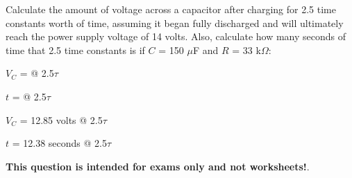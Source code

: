 

Calculate the amount of voltage across a capacitor after charging for 2.5 time constants worth of time, assuming it began fully discharged and will ultimately reach the power supply voltage of 14 volts.  Also, calculate how many seconds of time that 2.5 time constants is if $C$ = 150 $\mu$F and $R$ = 33 k$\Omega$:

\vskip 10pt

$V_C$ = \underbar{\hskip 50pt} @ 2.5$\tau$

\vskip 10pt

$t$ = \underbar{\hskip 50pt} @ 2.5$\tau$







$V_C$ = 12.85 volts @ 2.5$\tau$

\vskip 10pt

$t$ = 12.38 seconds @ 2.5$\tau$







{\bf This question is intended for exams only and not worksheets!}.



